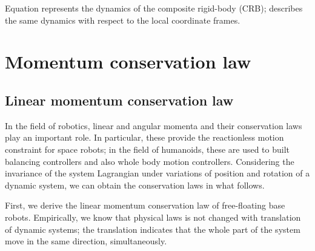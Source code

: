 Equation  represents the dynamics of the composite rigid-body (CRB);
 describes the same dynamics with respect to the local coordinate frames.

\section{Momentum conservation law}
\subsection{Linear momentum conservation law}

In the field of robotics,
linear and angular momenta and their conservation laws play an important role.
In particular, these provide the reactionless motion constraint for space robots;
in the field of humanoids,
these are used to built balancing controllers and also whole body motion controllers.
Considering the invariance of the system Lagrangian under variations of position and rotation of a dynamic system,
we can obtain the conservation laws in what follows.

First, we derive the linear momentum conservation law of free-floating base robots.
Empirically,
we know that physical laws is not changed with translation of dynamic systems;
the translation indicates that the whole part of the system move in the same direction, simultaneously.

